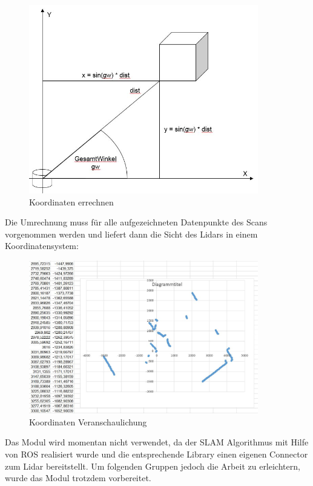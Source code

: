 \begin{figure}[h]
\begin{center}
\includegraphics[width=10cm]{images/chapter5/LidarKoordRechnung.jpg}
\caption{Koordinaten errechnen}
\label{Koordinaten_errechnen}
\end{center}
\end{figure}

Die Umrechnung muss für alle aufgezeichneten Datenpunkte des Scans vorgenommen werden und liefert dann die Sicht des Lidars in einem Koordinatensystem:

\begin{figure}[h]
\begin{center}
\includegraphics[width=10cm]{images/chapter5/kartKoord.jpg}
\caption{Koordinaten Veranschaulichung}
\label{Koordinaten_veranschaulichung}
\end{center}
\end{figure}




Das Modul wird momentan nicht verwendet, da der SLAM Algorithmus mit Hilfe von ROS realisiert wurde und die entsprechende Library einen eigenen Connector zum Lidar bereitstellt. Um folgenden Gruppen jedoch die Arbeit zu erleichtern, wurde das Modul trotzdem vorbereitet.



